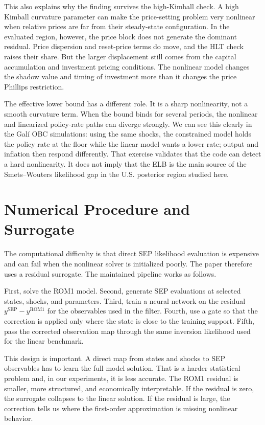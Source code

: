 \documentclass[10pt]{article}
\begin{document}
This also explains why the finding survives the high-Kimball check. A high Kimball curvature parameter can make the price-setting problem very nonlinear when relative prices are far from their steady-state configuration. In the evaluated region, however, the price block does not generate the dominant residual. Price dispersion and reset-price terms do move, and the HLT check raises their share. But the larger displacement still comes from the capital accumulation and investment pricing conditions. The nonlinear model changes the shadow value and timing of investment more than it changes the price Phillips restriction.

The effective lower bound has a different role. It is a sharp nonlinearity, not a smooth curvature term. When the bound binds for several periods, the nonlinear and linearized policy-rate paths can diverge strongly. We can see this clearly in the Gal\'i OBC simulations: using the same shocks, the constrained model holds the policy rate at the floor while the linear model wants a lower rate; output and inflation then respond differently. That exercise validates that the code can detect a hard nonlinearity. It does not imply that the ELB is the main source of the Smets--Wouters likelihood gap in the U.S. posterior region studied here.

\section*{Numerical Procedure and Surrogate}

The computational difficulty is that direct SEP likelihood evaluation is expensive and can fail when the nonlinear solver is initialized poorly. The paper therefore uses a residual surrogate. The maintained pipeline works as follows.

First, solve the ROM1 model. Second, generate SEP evaluations at selected states, shocks, and parameters. Third, train a neural network on the residual $y^{\mathrm{SEP}}-y^{\mathrm{ROM1}}$ for the observables used in the filter. Fourth, use a gate so that the correction is applied only where the state is close to the training support. Fifth, pass the corrected observation map through the same inversion likelihood used for the linear benchmark.

This design is important. A direct map from states and shocks to SEP observables has to learn the full model solution. That is a harder statistical problem and, in our experiments, it is less accurate. The ROM1 residual is smaller, more structured, and economically interpretable. If the residual is zero, the surrogate collapses to the linear solution. If the residual is large, the correction tells us where the first-order approximation is missing nonlinear behavior.
\end{document}
